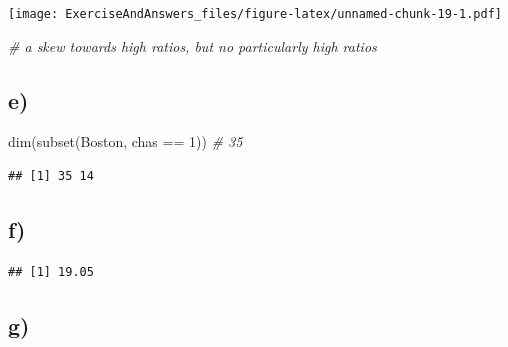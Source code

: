 \documentclass[
]{article}
\newenvironment{Shaded}{\begin{snugshade}}{\end{snugshade}}
\newcommand{\CommentTok}[1]{\textcolor[rgb]{0.56,0.35,0.01}{\textit{#1}}}
\newcommand{\DecValTok}[1]{\textcolor[rgb]{0.00,0.00,0.81}{#1}}
\newcommand{\FunctionTok}[1]{\textcolor[rgb]{0.00,0.00,0.00}{#1}}
\newcommand{\NormalTok}[1]{#1}
\newcommand{\SpecialCharTok}[1]{\textcolor[rgb]{0.00,0.00,0.00}{#1}}
\begin{document}
\texttt{[image: ExerciseAndAnswers\_files/figure-latex/unnamed-chunk-19-1.pdf]}

\begin{Shaded}
\begin{Highlighting}[]
\CommentTok{\# a skew towards high ratios, but no particularly high ratios}
\end{Highlighting}
\end{Shaded}

\hypertarget{e-1}{%
\subsection{e)}\label{e-1}}

\begin{Shaded}
\begin{Highlighting}[]
\FunctionTok{dim}\NormalTok{(}\FunctionTok{subset}\NormalTok{(Boston, chas }\SpecialCharTok{==} \DecValTok{1}\NormalTok{)) }\CommentTok{\# 35}
\end{Highlighting}
\end{Shaded}

\begin{verbatim}
## [1] 35 14
\end{verbatim}

\hypertarget{f-1}{%
\subsection{f)}\label{f-1}}

\begin{Shaded}
\end{Shaded}

\begin{verbatim}
## [1] 19.05
\end{verbatim}

\hypertarget{g}{%
\subsection{g)}\label{g}}

\begin{Shaded}
\end{Shaded}
\end{document}
